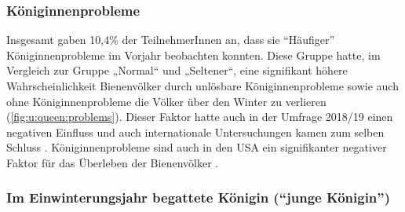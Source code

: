 \subsubsection{Königinnenprobleme}

Insgesamt gaben 10,4\% der TeilnehmerInnen an, dass sie \enquote{Häufiger} Königinnenprobleme im Vorjahr beobachten konnten. Diese Gruppe hatte, im Vergleich zur Gruppe „Normal`` und „Seltener``, eine signifikant höhere Wahrscheinlichkeit Bienenvölker durch unlösbare Königinnenprobleme sowie auch ohne Königinnenprobleme die Völker über den Winter zu verlieren (\cref{fig:u:queen:problems}). Dieser Faktor hatte auch in der Umfrage 2018/19 einen negativen Einfluss \citep{oberreiter2020} und auch internationale Untersuchungen kamen zum selben Schluss \citep{vanderzee2014}. Königinnenprobleme sind auch in den USA ein signifikanter negativer Faktor für das Überleben der Bienenvölker \citep{vanengelsdorp2013}.

\subsubsection{Im Einwinterungsjahr begattete Königin (\enquote{junge Königin})}

